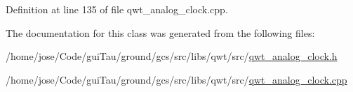 Definition at line 135 of file qwt\-\_\-analog\-\_\-clock.\-cpp.



The documentation for this class was generated from the following files\-:\begin{DoxyCompactItemize}
\item 
/home/jose/\-Code/gui\-Tau/ground/gcs/src/libs/qwt/src/\hyperlink{qwt__analog__clock_8h}{qwt\-\_\-analog\-\_\-clock.\-h}\item 
/home/jose/\-Code/gui\-Tau/ground/gcs/src/libs/qwt/src/\hyperlink{qwt__analog__clock_8cpp}{qwt\-\_\-analog\-\_\-clock.\-cpp}\end{DoxyCompactItemize}
